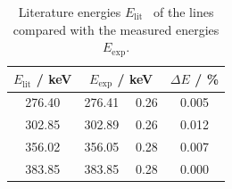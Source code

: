 \begin{table}[H]
	\centering
	\caption{Literature energies $E_\text{lit}$~\cite{ba133} of the  lines compared with the measured energies $E_\text{exp}$.}
	\label{tab:disc_ba}
	\begin{tabular}{c  c  c}
		\toprule
		$E_\text{lit}$ / keV & $E_\text{exp}$ / keV & $\Delta E$ / \%\\
		\midrule
		276.40 & 276.41  \, \clap{$\pm$} \,  0.26 & 0.005 \\
		 302.85 & 302.89  \, \clap{$\pm$} \,  0.26 & 0.012 \\
		 356.02 & 356.05  \, \clap{$\pm$} \,  0.28 & 0.007 \\
		 383.85 & 383.85  \, \clap{$\pm$} \,  0.28 & 0.000 \\
		 \bottomrule
	\end{tabular}
\end{table}
